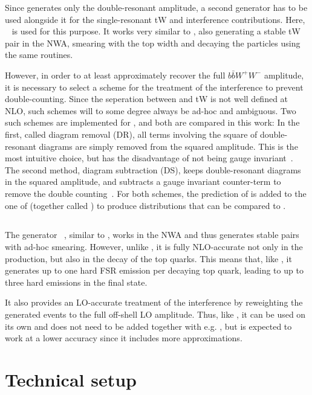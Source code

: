 Since \hvq generates only the double-resonant \ttbar amplitude, a second generator has to be used alongside it for the single-resonant tW and \tttW interference contributions. Here, \ST~\cite{Re:2010bp} is used for this purpose. It works very similar to \hvq, also generating a stable tW pair in the NWA, smearing with the top width and decaying the particles using the same routines.

However, in order to at least approximately recover the full $b \bar{b} W^+ W^-$ amplitude, it is necessary to select a scheme for the treatment of the \tttW interference to prevent double-counting. Since the seperation between \ttbar and tW is not well defined at NLO, such schemes will to some degree always be ad-hoc and ambiguous. Two such schemes are implemented for \ST, and both are compared in this work: In the first, called diagram removal (DR), all terms involving the square of double-resonant diagrams are simply removed from the squared amplitude. This is the most intuitive choice, but has the disadvantage of not being gauge invariant~\cite{Frixione:2008yi}. The second method, diagram subtraction (DS), keeps double-resonant diagrams in the squared amplitude, and subtracts a gauge invariant counter-term to remove the double counting~\cite{Tait:1999cf,Frixione:2008yi,Re:2010bp}. For both schemes, the prediction of \ST is added to the one of \hvq (together called \tttWsum) to produce distributions that can be compared to \bbfourl.

\subsection{\texorpdfstring{\ttb}{ttb\_NLO\_dec}}

The generator \ttb~\cite{Campbell:2014kua}, similar to \hvq, works in the NWA and thus generates stable \ttbar pairs with ad-hoc smearing. However, unlike \hvq, it is fully NLO-accurate not only in the production, but also in the decay of the top quarks. This means that, like \bbfourl, it generates up to one hard FSR emission per decaying top quark, leading to up to three hard emissions in the final state. 

It also provides an LO-accurate treatment of the \tttW interference by reweighting the generated \ttbar events to the full off-shell LO amplitude. Thus, like \bbfourl, it can be used on its own and does not need to be added together with e.g. \ST, but is expected to work at a lower accuracy since it includes more approximations.

\section{Technical setup}

